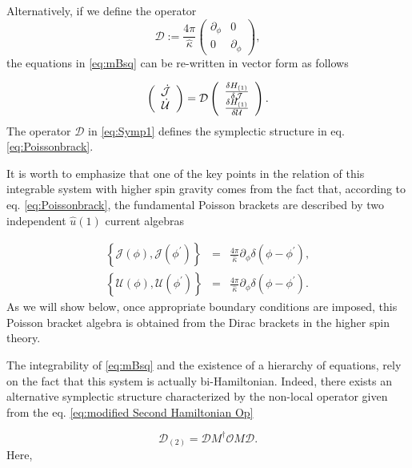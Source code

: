 \documentclass[letterpaper,11pt,oneside]{book}
\begin{document}
Alternatively, if we define the operator 
\begin{equation}
	\mathcal{D}:=\frac{4\pi}{\hat{\kappa}}\left(\begin{array}{cc}
		\partial_{\phi} & 0\\
		0 & \partial_{\phi}
	\end{array}\right),\label{eq:Symp1}
\end{equation}
the equations in \eqref{eq:mBsq} can be re-written in vector form
as follows

\[
\left(\begin{array}{c}
	\dot{\mathcal{J}}\\
	\dot{{\cal U}}
\end{array}\right)=\mathcal{D}\left(\begin{array}{c}
	\frac{\delta H_{\left(1\right)}}{\delta\mathcal{J}}\\
	\frac{\delta H_{\left(1\right)}}{\delta\mathcal{U}}
\end{array}\right).
\]
The operator $\mathcal{D}$ in \eqref{eq:Symp1} defines the symplectic
structure in eq. \eqref{eq:Poissonbrack}.

It is worth to emphasize that one of the key points in the relation
of this integrable system with higher spin gravity comes from the
fact that, according to eq. \eqref{eq:Poissonbrack}, the fundamental
Poisson brackets are described by two independent $\hat{u}\left(1\right)$
current algebras

\begin{eqnarray}
	\left\{ \mathcal{J}\left(\phi\right),\mathcal{J}\left(\phi^{\prime}\right)\right\}  & = & \frac{4\pi}{\hat{\kappa}}\partial_{\phi}\delta\left(\phi-\phi^{\prime}\right),\nonumber \\
	\left\{ \mathcal{U}\left(\phi\right),\mathcal{U}\left(\phi^{\prime}\right)\right\}  & = & \frac{4\pi}{\hat{\kappa}}\partial_{\phi}\delta\left(\phi-\phi^{\prime}\right).\label{eq:FUndbrack}
\end{eqnarray}
As we will show below, once appropriate boundary conditions are imposed,
this Poisson bracket algebra is obtained from the Dirac brackets in
the higher spin theory.

The integrability of \eqref{eq:mBsq} and the existence of a hierarchy
of equations, rely on the fact that this system is actually bi-Hamiltonian.
Indeed, there exists an alternative symplectic structure characterized
by the non-local operator given from the eq. \eqref{eq:modified Second Hamiltonian Op}

\begin{equation}
	\mathcal{D}_{\left(2\right)}=\mathcal{D}M^{\dagger}\mathcal{O}M\mathcal{D}.\label{eq:secondPstr}
\end{equation}
Here,
\end{document}
